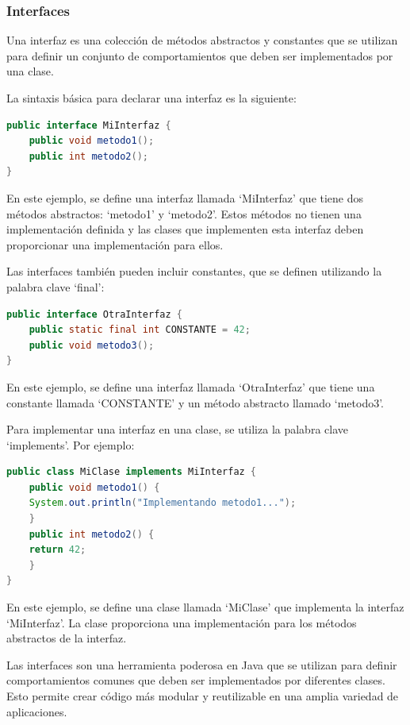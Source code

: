 \documentclass[executivepaper]{article}
\begin{document}
\subsubsection{Interfaces}
Una interfaz es una colección de métodos abstractos y constantes que se utilizan para definir un conjunto de comportamientos que deben ser implementados por una clase.

La sintaxis básica para declarar una interfaz es la siguiente:

\begin{lstlisting}[language=Java]
public interface MiInterfaz {
    public void metodo1();
    public int metodo2();
}
\end{lstlisting}
En este ejemplo, se define una interfaz llamada \enquote*{MiInterfaz} que tiene dos métodos abstractos: \enquote*{metodo1} y \enquote*{metodo2}. Estos métodos no tienen una implementación definida y las clases que implementen esta interfaz deben proporcionar una implementación para ellos.

Las interfaces también pueden incluir constantes, que se definen utilizando la palabra clave \enquote*{final}:

\begin{lstlisting}[language=Java]
public interface OtraInterfaz {
    public static final int CONSTANTE = 42;
    public void metodo3();
}
\end{lstlisting}

En este ejemplo, se define una interfaz llamada \enquote*{OtraInterfaz} que tiene una constante llamada \enquote*{CONSTANTE} y un método abstracto llamado \enquote*{metodo3}.

Para implementar una interfaz en una clase, se utiliza la palabra clave \enquote*{implements}. Por ejemplo:

\begin{lstlisting}[language=Java]
public class MiClase implements MiInterfaz {
    public void metodo1() {
    System.out.println("Implementando metodo1...");
    }
    public int metodo2() {
    return 42;
    }
}
\end{lstlisting}

En este ejemplo, se define una clase llamada \enquote*{MiClase} que implementa la interfaz \enquote*{MiInterfaz}. La clase proporciona una implementación para los métodos abstractos de la interfaz.

Las interfaces son una herramienta poderosa en Java que se utilizan para definir comportamientos comunes que deben ser implementados por diferentes clases. Esto permite crear código más modular y reutilizable en una amplia variedad de aplicaciones.
\end{document}
